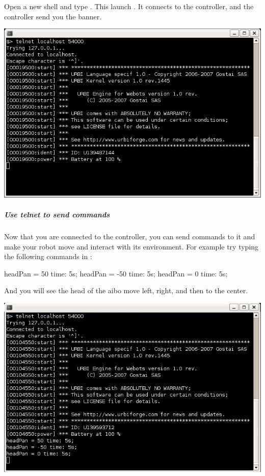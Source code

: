 Open a new shell and type .  This
launch . It connects to the \urbi controller, and the
\urbi controller send you the \urbi banner.

\begin{center}
  \includegraphics[width=.8\linewidth]{img/webots/telnet-urbi-linux}
\end{center}

\subparagraph{Use telnet to send commands}
\label{webots.firstrun.clientsoftware.telnet.usetelnet}%

Now that you are connected to the \urbi controller, you can send
commands to it and make your robot move and interact with its
environment. For example try typing the following commands in
:

\begin{urbifixme}
headPan = 50 time: 5s;
headPan = -50 time: 5s;
headPan = 0 time: 5s;
\end{urbifixme}

And you will see the head of the aibo move left, right, and then to
the center.

\begin{center}
  \includegraphics[width=.8\linewidth]{img/webots/telnet-some-urbi-cmd}
\end{center}

